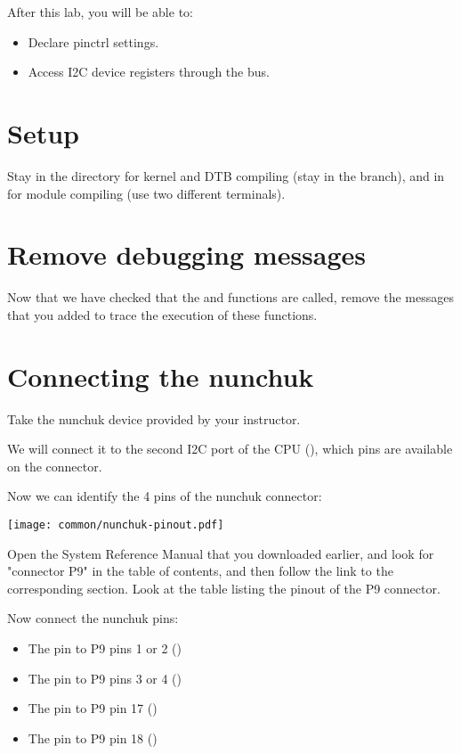 
After this lab, you will be able to:

\begin{itemize}
\item Declare pinctrl settings.
\item Access I2C device registers through the bus.
\end{itemize}

\section{Setup}

Stay in the  directory for kernel and DTB
compiling (stay in the  branch), and in
 for module compiling
(use two different terminals).

\section{Remove debugging messages}

Now that we have checked that the  and  functions
are called, remove the  messages that you added to
trace the execution of these functions.

\section{Connecting the nunchuk}

Take the nunchuk device provided by your instructor.

We will connect it to the second I2C port of the CPU (),
which pins are available on the  connector.

Now we can identify the 4 pins of the nunchuk connector:

\begin{center}
\texttt{[image: common/nunchuk-pinout.pdf]}
\end{center}

Open the System Reference Manual that you downloaded earlier,
and look for "connector P9" in the table of contents, and then
follow the link to the corresponding section. Look at the table listing
the pinout of the P9 connector.

Now connect the nunchuk pins:
\begin{itemize}
\item The  pin to P9 pins 1 or 2 ()
\item The  pin to P9 pins 3 or 4 ()
\item The  pin to P9 pin 17 ()
\item The  pin to P9 pin 18 ()
\end{itemize}

